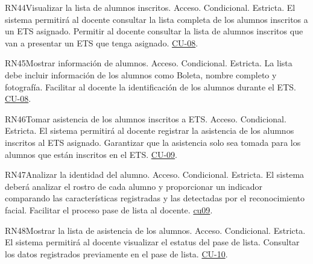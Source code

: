 \begin{BussinesRule}{RN44}{Visualizar la lista de alumnos inscritos.}
    \BRitem[Tipo:] Acceso.
    \BRitem[Clase:] Condicional.
    \BRitem[Nivel:] Estricta.
    \BRitem[Descripción:] El sistema permitirá al docente consultar la lista completa de los alumnos inscritos a un ETS asignado.
    \BRitem[Motivación:] Permitir al docente consultar la lista de alumnos inscritos que van a presentar un ETS que tenga asignado.
     \hyperlink{CU-08}{CU-08}.
    \end{BussinesRule}

\begin{BussinesRule}{RN45}{Mostrar información de alumnos.}
    \BRitem[Tipo:] Acceso.
    \BRitem[Clase:] Condicional.
    \BRitem[Nivel:] Estricta.
    \BRitem[Descripción:] La lista debe incluir información de los alumnos como Boleta, nombre completo y fotografía.
    \BRitem[Motivación:] Facilitar al docente la identificación de los alumnos durante el ETS.
     \hyperlink{CU-08}{CU-08}.
    \end{BussinesRule}

\begin{BussinesRule}{RN46}{Tomar asistencia de los alumnos inscritos a ETS.}
    \BRitem[Tipo:] Acceso.
    \BRitem[Clase:] Condicional.
    \BRitem[Nivel:] Estricta.
    \BRitem[Descripción:] El sistema permitirá al docente registrar la asistencia de los alumnos inscritos al ETS asignado.
    \BRitem[Motivación:] Garantizar que la asistencia solo sea tomada para los alumnos que están inscritos en el ETS.
     \hyperlink{CU-09}{CU-09}.
    \end{BussinesRule}

\begin{BussinesRule}{RN47}{Analizar la identidad del alumno.}
    \BRitem[Tipo:] Acceso.
    \BRitem[Clase:] Condicional.
    \BRitem[Nivel:] Estricta.
    \BRitem[Descripción:] El sistema deberá analizar el rostro de cada alumno y proporcionar un indicador comparando las características registradas y las detectadas por el reconocimiento facial.
    \BRitem[Motivación:] Facilitar el proceso pase de lista al docente. 
     \hyperlink{CU-09}{cu09}.
    \end{BussinesRule}

\begin{BussinesRule}{RN48}{Mostrar la lista de asistencia de los alumnos.}
    \BRitem[Tipo:] Acceso.
    \BRitem[Clase:] Condicional.
    \BRitem[Nivel:] Estricta.
    \BRitem[Descripción:] El sistema permitirá al docente visualizar el estatus del pase de lista.
    \BRitem[Motivación:] Consultar los datos registrados previamente en el pase de lista.
     \hyperlink{CU-10}{CU-10}.
    \end{BussinesRule}


